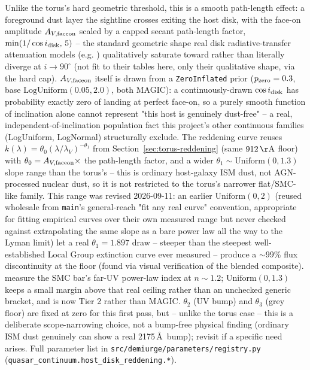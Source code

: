 \documentclass{aastex7}
\begin{document}
Unlike the torus's hard geometric threshold, this is a smooth path-length
effect: a foreground dust layer the sightline crosses exiting the host
disk, with the face-on amplitude $A_{V,\rm faceon}$ scaled by a capped
secant path-length factor, $\min(1/\cos i_{\rm disk},\,5)$ -- the standard
geometric shape real disk radiative-transfer attenuation models (e.g.
\citealt{TuffsEtAl2004}) qualitatively saturate toward rather than
literally diverge at $i \to 90^\circ$ (not fit to their tables here, only
their qualitative shape, via the hard cap). $A_{V,\rm faceon}$ itself is
drawn from a \texttt{ZeroInflated} prior ($p_{\rm zero}=0.3$, base
$\mathrm{LogUniform}(0.05, 2.0)$, both MAGIC): a continuously-drawn $\cos
i_{\rm disk}$ has probability exactly zero of landing at perfect face-on,
so a purely smooth function of inclination alone cannot represent "this
host is genuinely dust-free" -- a real, independent-of-inclination
population fact this project's other continuous families (LogUniform,
LogNormal) structurally exclude. The reddening curve reuses
$k(\lambda) = \theta_0 (\lambda/\lambda_V)^{-\theta_1}$ from
Section~\ref{sec:torus-reddening} (same $912\,\mathrm{\AA}$ floor) with
$\theta_0 = A_{V,\rm faceon} \times$ the path-length factor, and a wider
$\theta_1 \sim \mathrm{Uniform}(0, 1.3)$ slope range than the torus's --
this is ordinary host-galaxy ISM dust, not AGN-processed nuclear dust, so
it is not restricted to the torus's narrower flat/SMC-like family. This
range was revised 2026-09-11: an earlier $\mathrm{Uniform}(0,2)$ (reused
wholesale from \texttt{main}'s general-reach "fit any real curve"
convention, appropriate for fitting empirical curves over their own
measured range but never checked against extrapolating the same slope as
a bare power law all the way to the Lyman limit) let a real
$\theta_1=1.897$ draw -- steeper than the steepest well-established Local
Group extinction curve ever measured -- produce a $\sim$99\% flux
discontinuity at the floor (found via visual verification of the blended
composite). \citet{PrevotEtAl1984} measure the SMC bar's far-UV power-law
index at $n\sim1.2$; $\mathrm{Uniform}(0, 1.3)$ keeps a small margin above
that real ceiling rather than an unchecked generic bracket, and is now
Tier 2 rather than MAGIC. $\theta_2$ (UV bump) and $\theta_3$ (grey
floor) are fixed at zero for this first pass, but -- unlike the torus case
-- this is a deliberate scope-narrowing choice, not a bump-free physical
finding (ordinary ISM dust genuinely can show a real 2175\,\AA\ bump);
revisit if a specific need arises. Full parameter list in
\texttt{src/demiurge/parameters/registry.py}
(\texttt{quasar\_continuum.host\_disk\_reddening.*}).
\end{document}
